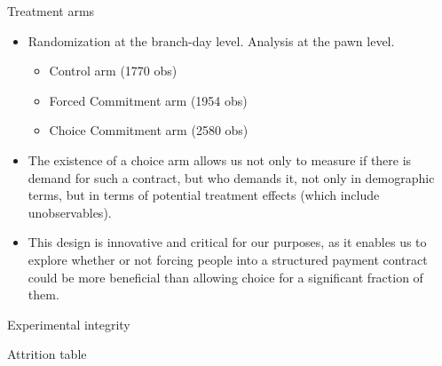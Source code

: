 \documentclass[8pt]{beamer}
\begin{document}
\begin{frame}{Treatment arms}
\label{treatment_arms}
   \begin{itemize}
    \vfill \item Randomization at the branch-day level.  Analysis at the pawn level.
    \begin{itemize}
        \vfill \item Control arm (1770 obs)
       \vfill \item Forced Commitment arm (1954 obs)
       \vfill \item Choice Commitment arm (2580 obs)
    \end{itemize}
    \vfill \item The existence of a choice arm allows us not only to measure if there is demand for such a contract, but who demands it, not only in demographic terms, but in terms of potential treatment effects (which include unobservables).
   \vfill \item  This design is innovative and critical for our purposes, as it enables us to explore whether or not forcing people into a structured payment contract could be more beneficial than allowing choice for a significant fraction of them.
\end{itemize}
\end{frame}







\begin{frame}{Experimental integrity}
\label{experimental_integrity}
    \begin{table}[H]
\caption{Attrition table}
\label{attrition_table}
\begin{center}
\small{}
\end{center}
\end{table}
\end{frame}
\end{document}

